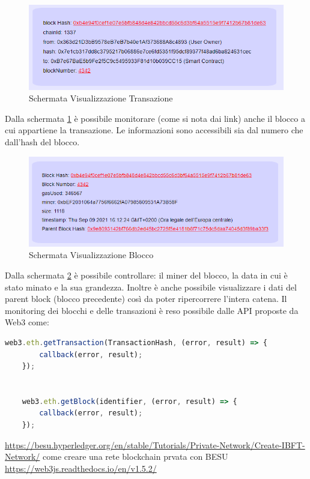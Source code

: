 \documentclass[11pt,a4paper,titlepage]{report}
\begin{document}
\begin{figure}[h]
	\includegraphics[width=\textwidth]{Transaction_Print}
	\centering
	\caption{Schermata Visualizzazione Transazione}
	\label{fig:Transaction_Print}
\end{figure}

Dalla schermata \ref{fig:Transaction_Print} è possibile monitorare (come si nota dai link) anche il blocco a cui appartiene la transazione. Le informazioni sono accessibili sia dal numero che dall'hash del blocco.
\begin{figure}[h]
	\includegraphics[width=\textwidth]{Block_Print}
	\centering
	\caption{Schermata Visualizzazione Blocco}
	\label{fig:Block_Print}
\end{figure}

Dalla schermata \ref{fig:Block_Print} è possibile controllare: il miner del blocco, la data in cui è stato minato e la sua grandezza. Inoltre è anche possibile visualizzare i dati del parent block (blocco precedente) così da poter ripercorrere l'intera catena. Il monitoring dei blocchi e delle transazioni è reso possibile dalle API proposte da Web3 come: 

\begin{lstlisting}[language=JavaScript]
	web3.eth.getTransaction(TransactionHash, (error, result) => {
		callback(error, result);
	});
	
	
	web3.eth.getBlock(identifier, (error, result) => {
		callback(error, result);
	});
\end{lstlisting}

\begin{thebibliography}{1}
\bibitem{} \url{https://besu.hyperledger.org/en/stable/Tutorials/Private-Network/Create-IBFT-Network/} come creare una rete blockchain prvata con BESU
\bibitem{} \url{https://web3js.readthedocs.io/en/v1.5.2/}
\end{thebibliography}
\end{document}

